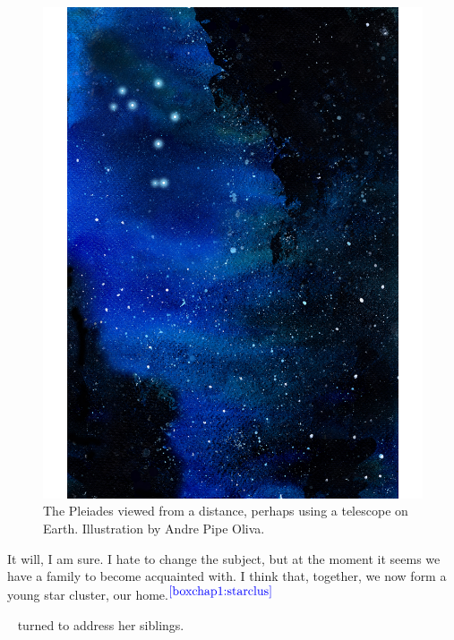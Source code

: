 \documentclass[main.tex]{subfiles}
\begin{document}
\begin{figure}
\includegraphics[width=\columnwidth,angle=270,origin=c]{ch1_4.pdf}
\caption{The Pleiades viewed from a distance, perhaps using a telescope on Earth.  Illustration by Andre Pipe Oliva.
\label{fig:fig4}}
\end{figure}


\par \Maia It will, I am sure.  I hate to change the subject, but at the moment it seems we have a family to become acquainted with.  I think that, together, we now form a young star cluster, our home.$^{\textcolor{blue}{\ref{boxchap1:starclus}}}$

\par \nar \rmmaia~ turned to address her siblings.

\end{document}
